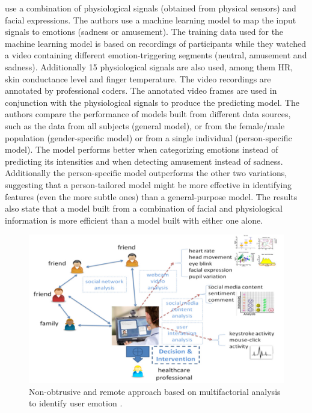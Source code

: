 \textcite{bailenson2008real} use a combination of physiological signals (obtained from physical sensors) and facial expressions. The authors use a machine learning model to map the input signals to emotions (sadness or amusement). The training data used for the machine learning model is based on recordings of participants while they watched a video containing different emotion-triggering segments (neutral, amusement and sadness). Additionally 15 physiological signals are also used, among them HR, skin conductance level and finger temperature. The video recordings are annotated by professional coders. The annotated video frames are used in conjunction with the physiological signals to produce the predicting model. The authors compare the performance of models built from different data sources, such as the data from all subjects (general model), or from the female/male population (gender-specific model) or from a single individual (person-specific model). The model performs better when categorizing emotions instead of predicting its intensities and when detecting amusement instead of sadness. Additionally the person-specific model outperforms the other two variations, suggesting that a person-tailored model might be more effective in identifying features (even the more subtle ones) than a general-purpose model. The results also state that a model built from a combination of facial and physiological information is more efficient than a model built with either one alone.

\begin{figure}
\centering
\includegraphics[width=0.9\linewidth]{figures/zhou.png}
\caption{Non-obtrusive and remote approach based on multifactorial analysis to identify user emotion \textcite{mental}.}
\label{fig:zhou}
\end{figure}

